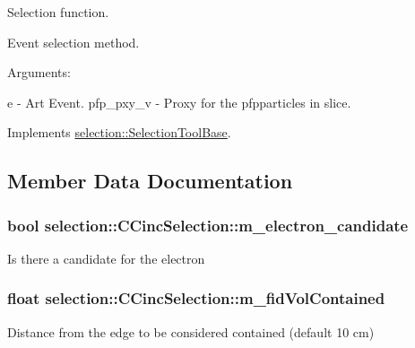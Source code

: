 Selection function. 

Event selection method.

Arguments\+:

e -\/ Art Event. pfp\+\_\+pxy\+\_\+v -\/ Proxy for the pfpparticles in slice. 

Implements \hyperlink{classselection_1_1SelectionToolBase_ab63818dac49b43418fe9eb3b8cd98c9c}{selection\+::\+Selection\+Tool\+Base}.



\subsection{Member Data Documentation}
\subsubsection[{\texorpdfstring{m\+\_\+electron\+\_\+candidate}{m_electron_candidate}}]{\setlength{\rightskip}{0pt plus 5cm}bool selection\+::\+C\+Cinc\+Selection\+::m\+\_\+electron\+\_\+candidate\hspace{0.3cm}{\ttfamily [private]}}\hypertarget{classselection_1_1CCincSelection_a61b7a5e571eac85c8171a3dbd6ab57c6}{}\label{classselection_1_1CCincSelection_a61b7a5e571eac85c8171a3dbd6ab57c6}
Is there a candidate for the electron 
\subsubsection[{\texorpdfstring{m\+\_\+fid\+Vol\+Contained}{m_fidVolContained}}]{\setlength{\rightskip}{0pt plus 5cm}float selection\+::\+C\+Cinc\+Selection\+::m\+\_\+fid\+Vol\+Contained\hspace{0.3cm}{\ttfamily [private]}}\hypertarget{classselection_1_1CCincSelection_a3412d86b03a97a65fed3d5d8a41ed2c0}{}\label{classselection_1_1CCincSelection_a3412d86b03a97a65fed3d5d8a41ed2c0}
Distance from the edge to be considered contained (default 10 cm) 
